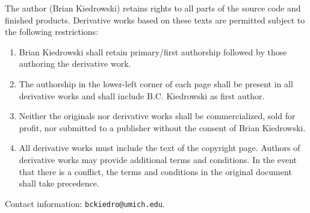 \noindent The author (Brian Kiedrowski) retains rights to all parts of the source code and finished products. Derivative works based on these texts are permitted subject to the following restrictions:
\begin{enumerate}
  \item Brian Kiedrowski shall retain primary/first authorship followed by those authoring the derivative work.
  \item The authorship in the lower-left corner of each page shall be present in all derivative works and shall include B.C. Kiedrowski as first author.
  \item Neither the originals nor derivative works shall be commercialized, sold for profit, nor submitted to a publisher without the consent of Brian Kiedrowski.
  \item All derivative works must include the text of the copyright page. Authors of derivative works may provide additional terms and conditions. In the event that there is a conflict, the terms and conditions in the original document shall take precedence.
\end{enumerate}

\noindent Contact information: \texttt{bckiedro@umich.edu}.
\normalsize

%
%
%


